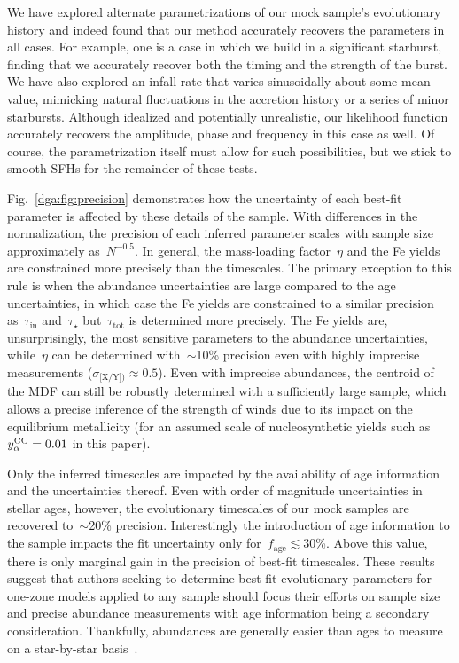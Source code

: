 We have explored alternate parametrizations of our mock sample's evolutionary
history and indeed found that our method accurately recovers the parameters
in all cases.
For example, one is a case in which we build in a significant starburst,
finding that we accurately recover both the timing and the strength of the
burst.
We have also explored an infall rate that varies sinusoidally about some mean
value, mimicking natural fluctuations in the accretion history or a series of
minor starbursts.
Although idealized and potentially unrealistic, our likelihood function
accurately recovers the amplitude, phase and frequency in this case as well.
Of course, the parametrization itself must allow for such possibilities, but
we stick to smooth SFHs for the remainder of these tests.
\par
Fig.~\ref{dga:fig:precision} demonstrates how the uncertainty of each best-fit
parameter is affected by these details of the sample.
With differences in the normalization, the precision of each inferred parameter
scales with sample size approximately as~$N^{-0.5}$.
In general, the mass-loading factor~$\eta$ and the Fe yields are constrained
more precisely than the timescales.
The primary exception to this rule is when the abundance uncertainties are
large compared to the age uncertainties, in which case the Fe yields are
constrained to a similar precision as~$\tau_\text{in}$ and~$\tau_\star$
but~$\tau_\text{tot}$ is determined more precisely.
The Fe yields are, unsurprisingly, the most sensitive parameters to the
abundance uncertainties, while~$\eta$ can be determined with~$\sim$10\% precision
even with highly imprecise measurements ($\sigma_\text{[X/Y])} \approx 0.5$).
Even with imprecise abundances, the centroid of the MDF can still be robustly
determined with a sufficiently large sample, which allows a precise inference
of the strength of winds due to its impact on the equilibrium metallicity (for
an assumed scale of nucleosynthetic yields such as~$y_\alpha^\text{CC} = 0.01$ in this
paper).
\par
Only the inferred timescales are impacted by the availability of age
information and the uncertainties thereof.
Even with order of magnitude uncertainties in stellar ages, however, the
evolutionary timescales of our mock samples are recovered to~$\sim$20\%
precision.
Interestingly the introduction of age information to the sample impacts the
fit uncertainty only for~$f_\text{age} \lesssim 30$\%.
Above this value, there is only marginal gain in the precision of best-fit
timescales.
These results suggest that authors seeking to determine best-fit evolutionary
parameters for one-zone models applied to any sample should focus their efforts
on sample size and precise abundance measurements with age information being
a secondary consideration.
Thankfully, abundances are generally easier than ages to measure on a
star-by-star basis~\citep{Soderblom2010, Chaplin2013}.

